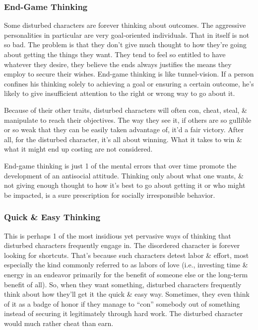 \documentclass{article}
\numberwithin{equation}{section}
\begin{document}
\subsubsection{End-Game Thinking} Some disturbed characters are forever thinking about outcomes. The aggressive personalities in particular are very goal-oriented individuals. That in itself is not so bad. The problem is that they don't give much thought to how they're going about getting the things they want. They tend to feel so entitled to have whatever they desire, they believe the ends always justifies the means they employ to secure their wishes. End-game thinking is like tunnel-vision. If a person confines his thinking solely to achieving a goal or ensuring a certain outcome, he's likely to give insufficient attention to the right or wrong way to go about it.

Because of their other traits, disturbed characters will often con, cheat, steal, \& manipulate to reach their objectives. The way they see it, if others are so gullible or so weak that they can be easily taken advantage of, it'd a fair victory. After all, for the disturbed character, it's all about winning. What it takes to win \& what it might end up costing are not considered.

End-game thinking is just 1 of the mental errors that over time promote the development of an antisocial attitude. Thinking only about what one wants, \& not giving enough thought to how it's best to go about getting it or who might be impacted, is a sure prescription for socially irresponsible behavior.

\subsubsection{Quick \& Easy Thinking}
This is perhaps 1 of the most insidious yet pervasive ways of thinking that disturbed characters frequently engage in. The disordered character is forever looking for shortcuts. That's because such characters detest labor \& effort, most especially the kind commonly referred to as labors of love (i.e., investing time \& energy in an endeavor primarily for the benefit of someone else or the long-term benefit of all). So, when they want something, disturbed characters frequently think about how they'll get it the quick \& easy way. Sometimes, they even think of it as a badge of honor if they manage to ``con'' somebody out of something instead of securing it legitimately through hard work. The disturbed character would much rather cheat than earn.
\end{document}
